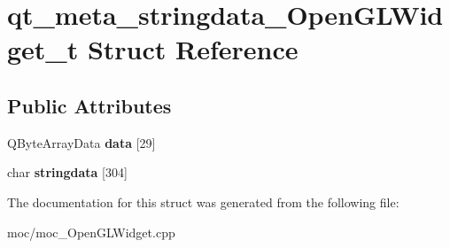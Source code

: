 \hypertarget{structqt__meta__stringdata___open_g_l_widget__t}{\section{qt\-\_\-meta\-\_\-stringdata\-\_\-\-Open\-G\-L\-Widget\-\_\-t Struct Reference}
\label{structqt__meta__stringdata___open_g_l_widget__t}
}
\subsection*{Public Attributes}
\begin{DoxyCompactItemize}
\item 
\hypertarget{structqt__meta__stringdata___open_g_l_widget__t_a661c3180c4cf26b3f083322f39cc8d5a}{Q\-Byte\-Array\-Data {\bfseries data} \mbox{[}29\mbox{]}}\label{structqt__meta__stringdata___open_g_l_widget__t_a661c3180c4cf26b3f083322f39cc8d5a}

\item 
\hypertarget{structqt__meta__stringdata___open_g_l_widget__t_a0c04c4b7b8a06eb290cd06961366047d}{char {\bfseries stringdata} \mbox{[}304\mbox{]}}\label{structqt__meta__stringdata___open_g_l_widget__t_a0c04c4b7b8a06eb290cd06961366047d}

\end{DoxyCompactItemize}


The documentation for this struct was generated from the following file\-:\begin{DoxyCompactItemize}
\item 
moc/moc\-\_\-\-Open\-G\-L\-Widget.\-cpp\end{DoxyCompactItemize}
